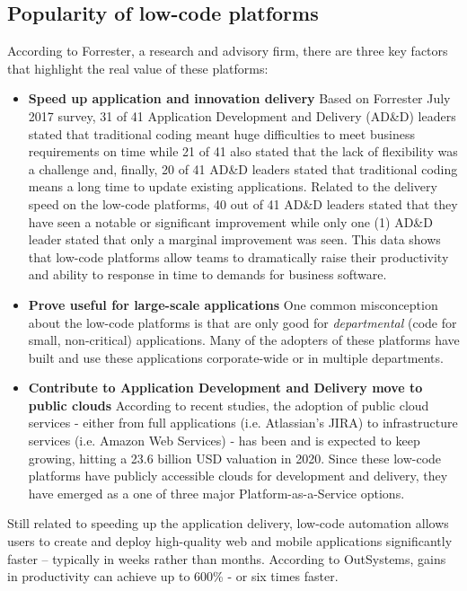 \documentclass{sigchi}
\begin{document}
\subsection{Popularity of low-code platforms}
According to Forrester, a research and advisory firm, there are three key factors that highlight the real value of these platforms\cite{forresterwavelowcodeq4}:
\begin{itemize}
	\item \textbf{Speed up application and innovation delivery} Based on Forrester July 2017 survey, 31 of 41 Application Development and Delivery (AD\&D) leaders stated that traditional coding meant huge difficulties to meet business requirements on time while 21 of 41 also stated that the lack of flexibility was a challenge and, finally, 20 of 41 AD\&D leaders stated that traditional coding means a long time to update existing applications. Related to the delivery speed on the low-code platforms, 40 out of 41 AD\&D leaders stated that they have seen a notable or significant improvement while only one (1) AD\&D leader stated that only a marginal improvement was seen. This data shows that low-code platforms allow teams to dramatically raise their productivity and ability to response in time to demands for business software.
	\item \textbf{Prove useful for large-scale applications} One common misconception about the low-code platforms is that are only good for \textit{departmental} (code for small, non-critical) applications. Many of the adopters of these platforms have built and use these applications corporate-wide or in multiple departments.
	\item \textbf{Contribute to Application Development and Delivery move to public clouds} According to recent studies\cite{forresterpubliccloudmarket}, the adoption of public cloud services - either from full applications (i.e. Atlassian's JIRA) to infrastructure services (i.e. Amazon Web Services) - has been and is expected to keep growing, hitting a 23.6 billion USD valuation in 2020. Since these low-code platforms have publicly accessible clouds for development and delivery, they have emerged as a one of three major Platform-as-a-Service options.
\end{itemize}
Still related to speeding up the application delivery, low-code automation allows users to create and deploy high-quality web and mobile applications significantly faster – typically in weeks rather than months. According to OutSystems, gains in productivity can achieve up to 600\% - or six times faster.
\end{document}
